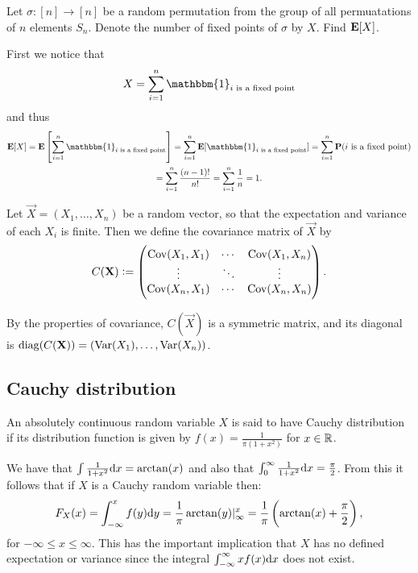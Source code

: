 \documentclass[11pt,a4paper]{article}
\begin{document}
\begin{exercise}
  Let $\sigma \colon [n] \to [n]$ be a random permutation from
  the group of all permuatations of $n$ elements $S_n$.
  Denote the number of fixed points of $\sigma$ by $X$. Find $\mathbf{E}[X]$.
\end{exercise}
\begin{solution}
  First we notice that
  \[
    X = \sum_{i=1}^{n} \mathbbm{1}_{i \text{ is a fixed point}}
  \]
  and thus
  \begin{multline*}
    \E[X] =
    \E\left[\sum_{i=1}^{n} \mathbbm{1}_{i \text{ is a fixed point}}\right]
    = \sum_{i=1}^{n} \E[\mathbbm{1}_{i \text{ is a fixed point}}]
    = \sum_{i=1}^{n} \Prob(i \text{ is a fixed point}) \\
    = \sum_{i=1}^{n} \frac{(n-1)!}{n!}
    = \sum_{i=1}^{n} \frac{1}{n}
    = 1.
  \end{multline*}
\end{solution}

\begin{definition}
  Let $\vec X  = (X_1,\dots,X_n)$ be a random vector,
  so that the expectation and variance of each $X_i$ is finite.
  Then we define the covariance matrix of $\vec X$ by
  \[
    C(\boldsymbol{\mathbf{X}}) := \begin{pmatrix}
      \operatorname{Cov}(X_1,X_1) & \cdots & \operatorname{Cov}(X_1,X_n) \\
      \vdots & \ddots & \vdots \\
      \operatorname{Cov}(X_n,X_1) & \cdots & \operatorname{Cov}(X_n,X_n)
    \end{pmatrix}.
  \]
\end{definition}
\begin{remark}
  By the properties of covariance,
  $C(\vec X)$ is a symmetric matrix,
  and its diagonal is $\operatorname{diag}(C(\boldsymbol{\mathbf{X}})) = (\operatorname{Var}(X_1),\dots,\operatorname{Var}(X_n))$.
\end{remark}

\subsection{Cauchy distribution}

\begin{definition}
  \label{def:cauchy-dist}
  An absolutely continuous random variable $X$
  is said to have Cauchy distribution if its distribution function is given
  by $f(x) = \frac{1}{\pi (1 + x^2)}$ for $x \in \mathbb{R}$.
\end{definition}

\begin{remark}
  We have that $\int \frac{1}{1 + x^2} \dx = \arctan(x)$
  and also that $\int_{0}^{\infty} \frac{1}{1 + x^2} \dx = \frac{\pi}{2}$.
  From this it follows that if $X$ is a Cauchy random variable then:
  \[
    F_X(x) =
    \int_{-\infty}^{x} f(y) \dy =
    \frac{1}{\pi} \arctan(y) \vert^x_{\infty} =
    \frac{1}{\pi} \del{\arctan(x) + \frac{\pi}{2}},
  \]
  for $-\infty \le x \le \infty$.
  This has the important implication that $X$ has no defined
  expectation or variance since the integral
  $\int_{-\infty}^{\infty} x f(x) \dx$
  does not exist.
\end{remark}
\end{document}
